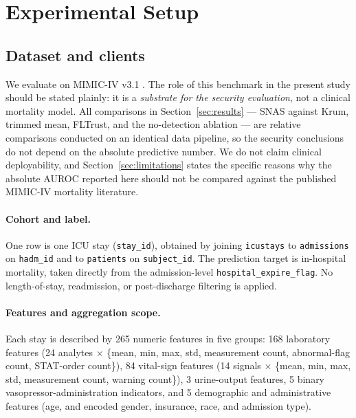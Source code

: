 \documentclass[pdflatex,sn-mathphys-num]{sn-jnl}
\begin{document}
\section{Experimental Setup}\label{sec:setup}

\subsection{Dataset and clients}

We evaluate on MIMIC-IV v3.1 \cite{johnson2023mimic}. The role of this benchmark in the present study should be stated plainly: it is a \emph{substrate for the security evaluation}, not a clinical mortality model. All comparisons in Section~\ref{sec:results} --- SNAS against Krum, trimmed mean, FLTrust, and the no-detection ablation --- are relative comparisons conducted on an identical data pipeline, so the security conclusions do not depend on the absolute predictive number. We do not claim clinical deployability, and Section~\ref{sec:limitations} states the specific reasons why the absolute AUROC reported here should not be compared against the published MIMIC-IV mortality literature.

\paragraph{Cohort and label.} One row is one ICU stay (\texttt{stay\_id}), obtained by joining \texttt{icustays} to \texttt{admissions} on \texttt{hadm\_id} and to \texttt{patients} on \texttt{subject\_id}. The prediction target is in-hospital mortality, taken directly from the admission-level \texttt{hospital\_expire\_flag}. No length-of-stay, readmission, or post-discharge filtering is applied.

\paragraph{Features and aggregation scope.} Each stay is described by 265 numeric features in five groups: 168 laboratory features (24 analytes $\times$ \{mean, min, max, std, measurement count, abnormal-flag count, STAT-order count\}), 84 vital-sign features (14 signals $\times$ \{mean, min, max, std, measurement count, warning count\}), 3 urine-output features, 5 binary vasopressor-administration indicators, and 5 demographic and administrative features (age, and encoded gender, insurance, race, and admission type).
\end{document}
